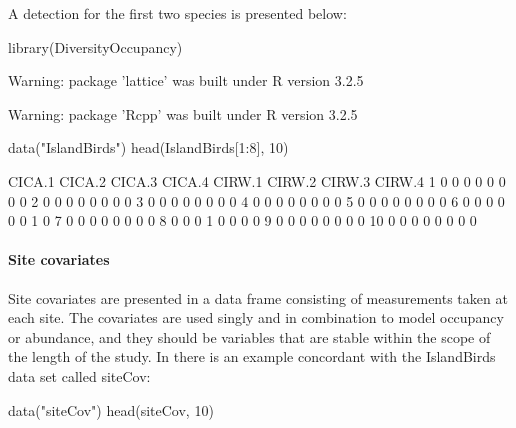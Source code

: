 \documentclass[article]{jss}
\begin{document}
A detection for the first two species is presented below:

\begin{CodeChunk}
\begin{CodeInput}
library(DiversityOccupancy)
\end{CodeInput}
\begin{CodeOutput}
Warning: package 'lattice' was built under R version 3.2.5
\end{CodeOutput}
\begin{CodeOutput}
Warning: package 'Rcpp' was built under R version 3.2.5
\end{CodeOutput}
\begin{CodeInput}
data("IslandBirds")
head(IslandBirds[1:8], 10)
\end{CodeInput}
\begin{CodeOutput}
   CICA.1 CICA.2 CICA.3 CICA.4 CIRW.1 CIRW.2 CIRW.3 CIRW.4
1       0      0      0      0      0      0      0      0
2       0      0      0      0      0      0      0      0
3       0      0      0      0      0      0      0      0
4       0      0      0      0      0      0      0      0
5       0      0      0      0      0      0      0      0
6       0      0      0      0      0      0      1      0
7       0      0      0      0      0      0      0      0
8       0      0      0      1      0      0      0      0
9       0      0      0      0      0      0      0      0
10      0      0      0      0      0      0      0      0
\end{CodeOutput}
\end{CodeChunk}

\paragraph{Site covariates}\label{site-covariates}

Site covariates are presented in a data frame consisting of measurements
taken at each site. The covariates are used singly and in combination to
model occupancy or abundance, and they should be variables that are
stable within the scope of the length of the study. In
 there is an example concordant with the
IslandBirds data set called siteCov:

\begin{CodeChunk}
\begin{CodeInput}
data("siteCov")
head(siteCov, 10)
\end{CodeInput}
\end{CodeChunk}
\end{document}
